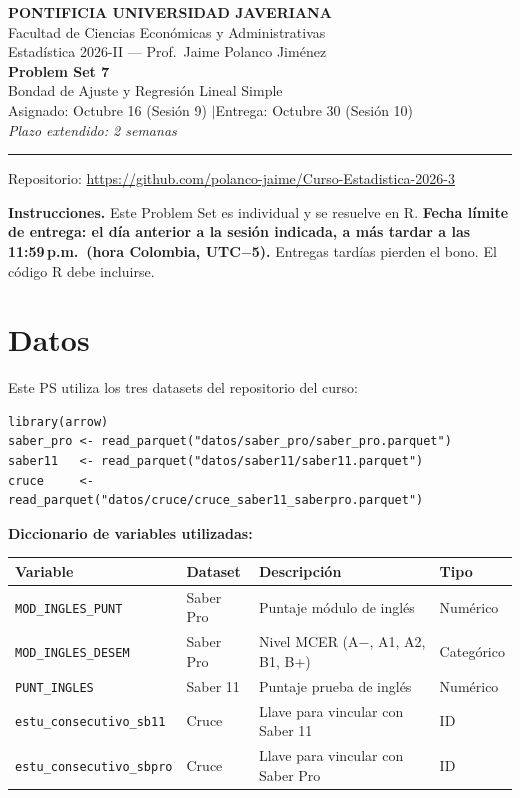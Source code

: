 \documentclass[11pt, a4paper]{article}
\begin{document}
\begin{center}
{\large\bfseries PONTIFICIA UNIVERSIDAD JAVERIANA}\\[3pt]
Facultad de Ciencias Econ\'omicas y Administrativas\\[2pt]
Estad\'istica 2026-II --- Prof.\ Jaime Polanco Jim\'enez\\[6pt]
{\LARGE\bfseries Problem Set 7}\\[3pt]
{\large Bondad de Ajuste y Regresi\'on Lineal Simple}\\[6pt]
Asignado: Octubre 16 (Sesi\'on 9) \quad$|$\quad Entrega: Octubre 30 (Sesi\'on 10)\\[3pt]
\textit{Plazo extendido: 2 semanas}
\end{center}

\vspace{6pt}
\rule{\linewidth}{0.5pt}
\vspace{2pt}
{\centering\small Repositorio: \url{https://github.com/polanco-jaime/Curso-Estadistica-2026-3}\par}
\vspace{6pt}

\textbf{Instrucciones.} Este Problem Set es individual y se resuelve en R.
\textbf{Fecha l\'imite de entrega: el d\'ia anterior a la sesi\'on indicada, a m\'as tardar a las 11:59\,p.m.\ (hora Colombia, UTC$-$5).} Entregas tard\'ias pierden el bono. El c\'odigo R debe incluirse.

\section*{Datos}

Este PS utiliza los tres datasets del repositorio del curso:

\begin{lstlisting}
library(arrow)
saber_pro <- read_parquet("datos/saber_pro/saber_pro.parquet")
saber11   <- read_parquet("datos/saber11/saber11.parquet")
cruce     <- read_parquet("datos/cruce/cruce_saber11_saberpro.parquet")
\end{lstlisting}

\textbf{Diccionario de variables utilizadas:}

\vspace{4pt}
\begin{tabular}{l l l l}
\toprule
\textbf{Variable} & \textbf{Dataset} & \textbf{Descripci\'on} & \textbf{Tipo} \\
\midrule
\texttt{MOD\_INGLES\_PUNT}  & Saber Pro & Puntaje m\'odulo de ingl\'es           & Num\'erico \\
\texttt{MOD\_INGLES\_DESEM} & Saber Pro & Nivel MCER (A$-$, A1, A2, B1, B+)    & Categ\'orico \\
\texttt{PUNT\_INGLES}       & Saber 11  & Puntaje prueba de ingl\'es             & Num\'erico \\
\texttt{estu\_consecutivo\_sb11}  & Cruce & Llave para vincular con Saber 11  & ID \\
\texttt{estu\_consecutivo\_sbpro} & Cruce & Llave para vincular con Saber Pro & ID \\
\bottomrule
\end{tabular}
\end{document}
